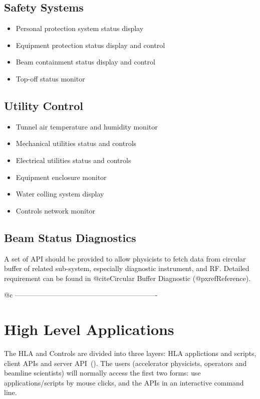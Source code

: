 \documentclass[letterpaper,showtrims]{memoir}
\begin{document}
\section{Safety Systems}

\begin{itemize}
\item Personal protection system status display
\item Equipment protection status display and control
\item Beam containment status display and control
\item Top-off status monitor
\end{itemize}

\section{Utility Control}

\begin{itemize}
\item Tunnel air temperature and humidity monitor
\item Mechanical utilities status and controls
\item Electrical utilities status and controls
\item Equipment enclosure monitor
\item Water colling system display
\item Controls network monitor
\end{itemize}


\section{Beam Status Diagnostics}

A set of API should be provided to allow physicists to fetch data from
circular buffer of related sub-system, especially diagnostic
instrument, and RF. Detailed requirement can be found in
@cite{Circular Buffer Diagnostic} (@pxref{Reference}). 



@c -------------------------------------------------------------


\chapter{High Level Applications}

The HLA and Controls are divided into three layers: HLA applictions and
scripts, client APIs and server API~(\cite{shen_hla_apis}).  The users
(accelerator physicists, operators and beamline scientists) will normally
access the first two forms: use applications/scripts by mouse clicks, and
the APIs in an interactive command line.
\end{document}
